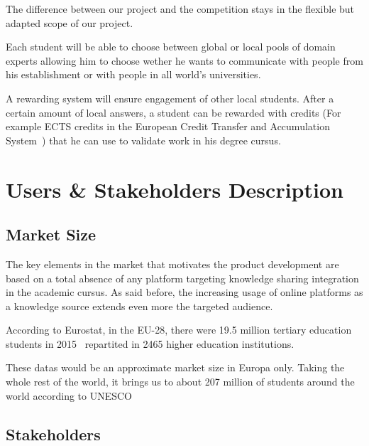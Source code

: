 \documentclass[12pt,a4paper,oneside, titlepage]{article}
\begin{document}
		The difference between our project and the competition stays in the flexible but adapted scope of our 
		project. \newline 
		
		Each student will be able to choose between global or local pools of domain experts allowing him to 
		choose wether he wants to communicate with people from his establishment or with people in all world's 
		universities. \newline
		
		A rewarding system will ensure engagement of other local students. After a certain amount 
		of local answers, a student can be rewarded with credits (For example ECTS credits in the European 
		Credit Transfer and Accumulation System~\cite{ectsWiki}) that he 
		can use to validate work in his degree cursus. 
		
    \newpage
	\section{Users \& Stakeholders Description}
	\subsection{Market Size}
	The key elements in the market that motivates the product development are based on a total absence of any platform 
	targeting knowledge sharing integration in the academic cursus. As said before, the increasing usage of online
	platforms as a knowledge source extends even more the targeted audience. \newline
	
	According to Eurostat, in the EU-28, there were 19.5 million tertiary education students in 
	2015~\cite{tertiaryStudentsEU} repartited in 2465 higher education institutions. \newline
	
	These datas would be an approximate market size in Europa only. Taking the whole rest of the world, it brings us to about 207 million of students 
	around the world according to UNESCO~\cite{higherEducationPaper}
	
	\subsection{Stakeholders}
\end{document}
